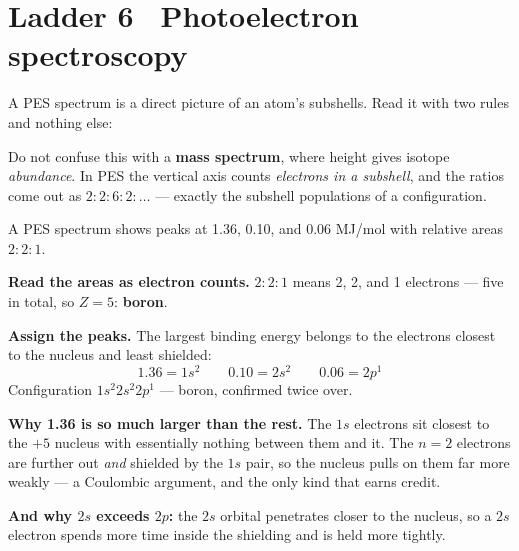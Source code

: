 \documentclass{apchem-worksheet}
\begin{document}
\section*{\sffamily Ladder 6 \textbullet\ Photoelectron spectroscopy}

A PES spectrum is a direct picture of an atom's subshells. Read it with
two rules and nothing else:

\begin{center}
\end{center}

\begin{apctrap}
Do not confuse this with a \textbf{mass spectrum}, where height gives
isotope \emph{abundance}. In PES the vertical axis counts
\emph{electrons in a subshell}, and the ratios come out as
$2:2:6:2:\ldots$ --- exactly the subshell populations of a
configuration.
\end{apctrap}

\begin{workedexample}
A PES spectrum shows peaks at 1.36, 0.10, and 0.06 MJ/mol with relative
areas $2 : 2 : 1$.

\textbf{Read the areas as electron counts.} $2 : 2 : 1$ means 2, 2, and
1 electrons --- five in total, so $Z = 5$: \textbf{boron}.

\textbf{Assign the peaks.} The largest binding energy belongs to the
electrons closest to the nucleus and least shielded:
\[ 1.36 = 1s^{2} \qquad 0.10 = 2s^{2} \qquad 0.06 = 2p^{1} \]
Configuration $1s^{2}2s^{2}2p^{1}$ --- boron, confirmed twice over.

\textbf{Why 1.36 is so much larger than the rest.} The $1s$ electrons
sit closest to the $+5$ nucleus with essentially nothing between them
and it. The $n = 2$ electrons are further out \emph{and} shielded by
the $1s$ pair, so the nucleus pulls on them far more weakly --- a
Coulombic argument, and the only kind that earns credit.

\textbf{And why $2s$ exceeds $2p$:} the $2s$ orbital penetrates closer
to the nucleus, so a $2s$ electron spends more time inside the shielding
and is held more tightly.
\end{workedexample}
\end{document}
